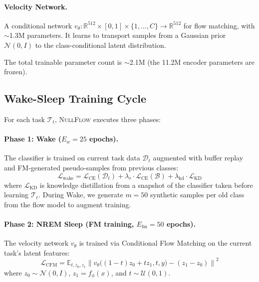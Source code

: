 \documentclass[10pt,twocolumn,letterpaper]{article}
\newcommand{\ours}{\textsc{NullFlow}}
\begin{document}
\paragraph{Velocity Network.} A conditional network $v_\theta: \mathbb{R}^{512} \times [0,1] \times \{1,\dots,C\} \to \mathbb{R}^{512}$ for flow matching, with $\sim$1.3M parameters. It learns to transport samples from a Gaussian prior $\mathcal{N}(0, I)$ to the class-conditional latent distribution.

The total trainable parameter count is $\sim$2.1M (the 11.2M encoder parameters are frozen).

\subsection{Wake-Sleep Training Cycle}
\label{sec:cycle}

For each task $\mathcal{T}_t$, \ours{} executes three phases:

\paragraph{Phase 1: Wake ($E_w=25$ epochs).}
The classifier is trained on current task data $\mathcal{D}_t$ augmented with buffer replay and FM-generated pseudo-samples from previous classes:
\begin{equation}
  \mathcal{L}_\text{wake} = \mathcal{L}_\text{CE}(\mathcal{D}_t) + \lambda_r \cdot \mathcal{L}_\text{CE}(\mathcal{B}) + \lambda_\text{kd} \cdot \mathcal{L}_\text{KD}
\end{equation}
where $\mathcal{L}_\text{KD}$ is knowledge distillation from a snapshot of the classifier taken before learning $\mathcal{T}_t$. During Wake, we generate $m=50$ synthetic samples per old class from the flow model to augment training.

\paragraph{Phase 2: NREM Sleep (FM training, $E_\text{fm}=50$ epochs).}
The velocity network $v_\theta$ is trained via Conditional Flow Matching on the current task's latent features:
\begin{equation}
  \mathcal{L}_\text{CFM} = \mathbb{E}_{t,z_0,z_1} \left\| v_\theta\bigl((1-t)z_0 + tz_1, t, y\bigr) - (z_1 - z_0) \right\|^2
\end{equation}
where $z_0 \sim \mathcal{N}(0,I)$, $z_1 = f_\phi(x)$, and $t \sim \mathcal{U}(0,1)$.
\end{document}
